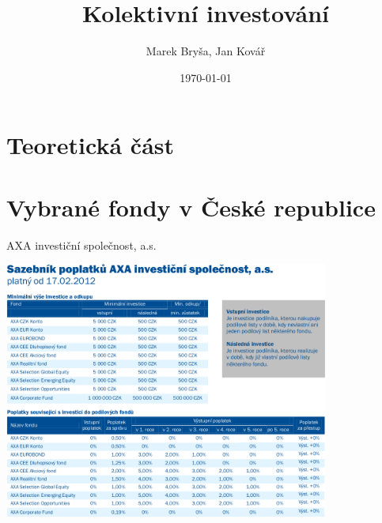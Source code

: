 \documentclass[xcolor=dvipsnames]{beamer}
\title{Kolektivní investování}
\author{Marek Bryša, Jan Kovář}
\institute
{
Masarykova Univerzita\\
Přírodovědecká fakulta
}
\date{\today}
\begin{document}
  \frame{\titlepage}
  \section{Teoretická část}

	\section{Vybrané fondy v České republice}
		\begin{frame}{AXA investiční společnost, a.s.}
			\begin{center}
				\includegraphics[width=0.8\textwidth]{axa_popl.png}			
			\end{center}
		\end{frame}
\end{document}
